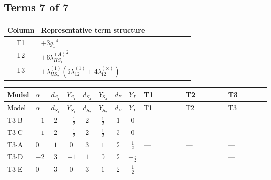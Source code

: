 \documentclass[8pt]{article}
\begin{document}
\begin{landscape}
\subsection*{Terms 7 of 7}
\begin{center}
\begin{tabular}{@{}c >{\raggedright\arraybackslash}p{0.82\linewidth}@{}}
\toprule
Column & Representative term structure \\
\midrule
T1 & \(\displaystyle +3 {g_1}^4\) \\
\midrule
T2 & \(\displaystyle +6 {\lambda_{HS_1}^{(A)}}^2\) \\
\midrule
T3 & \(\displaystyle +{\lambda_{HS_2}^{(1)}} (6 {\lambda_{12}^{(1)}}+4 {\lambda_{12}^{(\times)}})\) \\
\midrule
\bottomrule
\end{tabular}
\end{center}
\smallskip
\tiny
\begin{longtable}{@{}llcccccc >{\raggedright\arraybackslash}p{0.21\linewidth} >{\raggedright\arraybackslash}p{0.21\linewidth} >{\raggedright\arraybackslash}p{0.21\linewidth}@{}}
\toprule
Model & $\alpha$ & $d_{S_1}$ & $Y_{S_1}$ & $d_{S_2}$ & $Y_{S_2}$ & $d_F$ & $Y_F$ & T1 & T2 & T3 \\
\midrule
\endfirsthead
\toprule
Model & $\alpha$ & $d_{S_1}$ & $Y_{S_1}$ & $d_{S_2}$ & $Y_{S_2}$ & $d_F$ & $Y_F$ & T1 & T2 & T3 \\
\midrule
\endhead
T3-B & $-1$ & $2$ & $-\frac{1}{2}$ & $2$ & $\frac{1}{2}$ & $1$ & $0$ & --- & --- & --- \\
\midrule
T3-C & $-1$ & $2$ & $-\frac{1}{2}$ & $2$ & $\frac{1}{2}$ & $3$ & $0$ & --- & --- & --- \\
\midrule
T3-A & $0$ & $1$ & $0$ & $3$ & $1$ & $2$ & $\frac{1}{2}$ & --- & --- & --- \\
\midrule
T3-D & $-2$ & $3$ & $-1$ & $1$ & $0$ & $2$ & $-\frac{1}{2}$ & \scriptsize\adjustbox{max width=\linewidth}{$\begin{gathered} +3 {g_1}^4\end{gathered}$} & \scriptsize\adjustbox{max width=\linewidth}{$\begin{gathered} +6 {\lambda_{HS_1}^{(A)}}^2\end{gathered}$} & --- \\
\midrule
T3-E & $0$ & $3$ & $0$ & $3$ & $1$ & $2$ & $\frac{1}{2}$ & --- & \scriptsize\adjustbox{max width=\linewidth}{$\begin{gathered} +6 {\lambda_{HS_1}^{(A)}}^2\end{gathered}$} & \scriptsize\adjustbox{max width=\linewidth}{$\begin{gathered} +{\lambda_{HS_2}^{(1)}} (6 {\lambda_{12}^{(1)}}+4 {\lambda_{12}^{(\times)}})\end{gathered}$} \\
\midrule
\bottomrule
\end{longtable}
\clearpage

\end{landscape}
\end{document}
